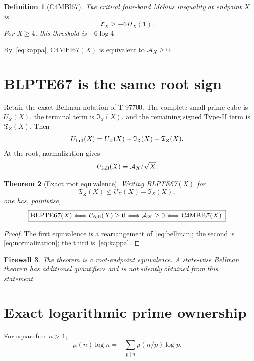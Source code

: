 \documentclass[11pt]{article}
\newtheorem{theorem}{Theorem}[section]
\newtheorem{definition}[theorem]{Definition}
\newtheorem{firewall}[theorem]{Firewall}
\newcommand{\Acal}{\mathcal A}
\newcommand{\Ccal}{\mathfrak C}
\newcommand{\Ical}{\mathfrak I}
\newcommand{\Tcal}{\mathfrak T}
\begin{document}
\begin{definition}[C4MBI67]
The critical four-band M\"obius inequality at endpoint $X$ is
\[
 \boxed{\Ccal_X\ge-6H_X(1).}
\]
For $X\ge4$, this threshold is $-6\log4$.
\end{definition}
By~\eqref{eq:kappa}, C4MBI67$(X)$ is equivalent to $\Acal_X\ge0$.

\section{BLPTE67 is the same root sign}
Retain the exact Bellman notation of T-97700.  The complete small-prime cube is
$U_Z(X)$, the terminal term is $\Ical_Z(X)$, and the remaining signed Type-II
term is $\Tcal_Z(X)$.  Then
\begin{equation}\label{eq:bellman}
 U_{\rm full}(X)=U_Z(X)-\Ical_Z(X)-\Tcal_Z(X).
\end{equation}
At the root, normalization gives
\begin{equation}\label{eq:normalization}
 U_{\rm full}(X)=\Acal_X/\sqrt X.
\end{equation}

\begin{theorem}[Exact root equivalence]\label{thm:equiv}
Writing BLPTE67$(X)$ for
\[
 \Tcal_Z(X)\le U_Z(X)-\Ical_Z(X),
\]
one has, pointwise,
\[
 \boxed{
 \mathrm{BLPTE67}(X)
 \Longleftrightarrow U_{\rm full}(X)\ge0
 \Longleftrightarrow \Acal_X\ge0
 \Longleftrightarrow \mathrm{C4MBI67}(X).}
\]
\end{theorem}
\begin{proof}
The first equivalence is a rearrangement of~\eqref{eq:bellman}; the second is
\eqref{eq:normalization}; the third is~\eqref{eq:kappa}.
\end{proof}

\begin{firewall}
The theorem is a root-endpoint equivalence.  A state-wise Bellman theorem has
additional quantifiers and is not silently obtained from this statement.
\end{firewall}

\section{Exact logarithmic prime ownership}
For squarefree $n>1$,
\begin{equation}\label{eq:mu-log}
 \mu(n)\log n=-\sum_{p\mid n}\mu(n/p)\log p.
\end{equation}
\end{document}

